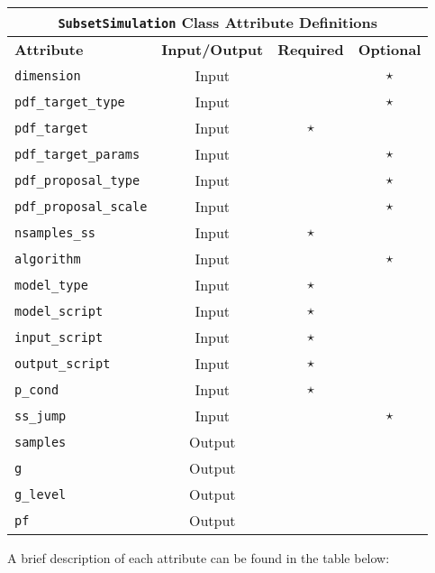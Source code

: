 \documentclass[./UsersGuide.tex]{subfiles}
\begin{document}
\begin{center}
	\begin{tabular}{ |l|c|c|c| } 
				\hline
		\multicolumn{4}{|c|}{\texttt{SubsetSimulation} Class Attribute Definitions} \\
		\hline
		\textbf{Attribute} & \textbf{Input/Output} & \textbf{Required} & \textbf{Optional} \\
		\hline
		\texttt{dimension} & Input &  & $\star$  \\ 
		\hline
		\texttt{pdf\_target\_type}& Input &  &  $\star$  \\ 
		\hline
		\texttt{pdf\_target} & Input & $\star$ &   \\ 
		\hline
		\texttt{pdf\_target\_params} & Input  & &  $\star$  \\ 
		\hline
		\texttt{pdf\_proposal\_type} & Input & & $\star$   \\ 
		\hline
		\texttt{pdf\_proposal\_scale} & Input &  & $\star$  \\ 
		\hline
		\texttt{nsamples\_ss}& Input & $\star$ &    \\ 
		\hline
		\texttt{algorithm} & Input &  & $\star$  \\ 
		\hline
		\texttt{model\_type}& Input & $\star$ &    \\ 
		\hline
		\texttt{model\_script}& Input & $\star$ &    \\ 
		\hline
		\texttt{input\_script}& Input & $\star$ &    \\ 
		\hline
		\texttt{output\_script}& Input & $\star$ &    \\ 
		\hline
		\texttt{p\_cond}& Input & $\star$ &    \\ 
		\hline
		\texttt{ss\_jump} & Input &  & $\star$  \\ 
		\hline
		\texttt{samples} & Output & & \\
		\hline
		\texttt{g} & Output & & \\
		\hline
		\texttt{g\_level} & Output & & \\
		\hline
		\texttt{pf} & Output & & \\
		\hline
	\end{tabular}%
\end{center}


\noindent
A brief description of each attribute can be found in the table below:
\end{document}
